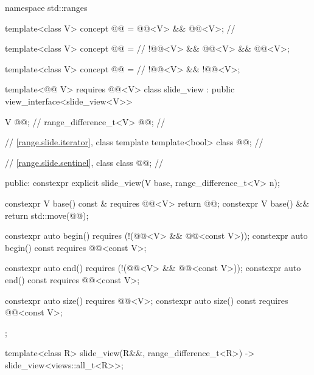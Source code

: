 %
%
%
\begin{codeblock}
namespace std::ranges {
  template<class V>
  concept @@ = @@<V> && @@<V>;       // \expos

  template<class V>
  concept @@ =                                            // \expos
    !@@<V> && @@<V> && @@<V>;

  template<class V>
  concept @@ =                                           // \expos
    !@@<V> && !@@<V>;

  template<@@ V>
    requires @@<V>
  class slide_view : public view_interface<slide_view<V>> {
    V @@;                            // \expos
    range_difference_t<V> @@;           // \expos

    // \ref{range.slide.iterator}, class template 
    template<bool> class @@;      // \expos

    // \ref{range.slide.sentinel}, class 
    class @@;                     // \expos

  public:
    constexpr explicit slide_view(V base, range_difference_t<V> n);

    constexpr V base() const & requires @@<V> { return @@; }
    constexpr V base() && { return std::move(@@); }

    constexpr auto begin()
      requires (!(@@<V> && @@<const V>));
    constexpr auto begin() const requires @@<const V>;

    constexpr auto end()
      requires (!(@@<V> && @@<const V>));
    constexpr auto end() const requires @@<const V>;

    constexpr auto size() requires @@<V>;
    constexpr auto size() const requires @@<const V>;
  };

  template<class R>
    slide_view(R&&, range_difference_t<R>) -> slide_view<views::all_t<R>>;
}
\end{codeblock}

